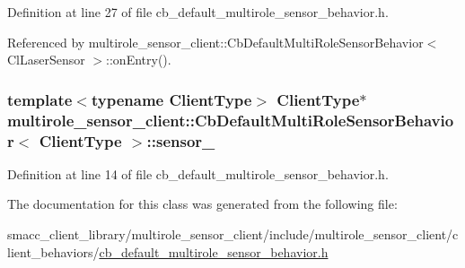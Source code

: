 Definition at line 27 of file cb\+\_\+default\+\_\+multirole\+\_\+sensor\+\_\+behavior.\+h.



Referenced by multirole\+\_\+sensor\+\_\+client\+::\+Cb\+Default\+Multi\+Role\+Sensor\+Behavior$<$ Cl\+Laser\+Sensor $>$\+::on\+Entry().

\subsubsection[{\texorpdfstring{sensor\+\_\+}{sensor_}}]{\setlength{\rightskip}{0pt plus 5cm}template$<$typename Client\+Type$>$ Client\+Type$\ast$ {\bf multirole\+\_\+sensor\+\_\+client\+::\+Cb\+Default\+Multi\+Role\+Sensor\+Behavior}$<$ Client\+Type $>$\+::sensor\+\_\+}\hypertarget{classmultirole__sensor__client_1_1CbDefaultMultiRoleSensorBehavior_a5e4e65ada73da49c2b8579b422b97d0d}{}\label{classmultirole__sensor__client_1_1CbDefaultMultiRoleSensorBehavior_a5e4e65ada73da49c2b8579b422b97d0d}


Definition at line 14 of file cb\+\_\+default\+\_\+multirole\+\_\+sensor\+\_\+behavior.\+h.



The documentation for this class was generated from the following file\+:\begin{DoxyCompactItemize}
\item 
smacc\+\_\+client\+\_\+library/multirole\+\_\+sensor\+\_\+client/include/multirole\+\_\+sensor\+\_\+client/client\+\_\+behaviors/\hyperlink{cb__default__multirole__sensor__behavior_8h}{cb\+\_\+default\+\_\+multirole\+\_\+sensor\+\_\+behavior.\+h}\end{DoxyCompactItemize}
